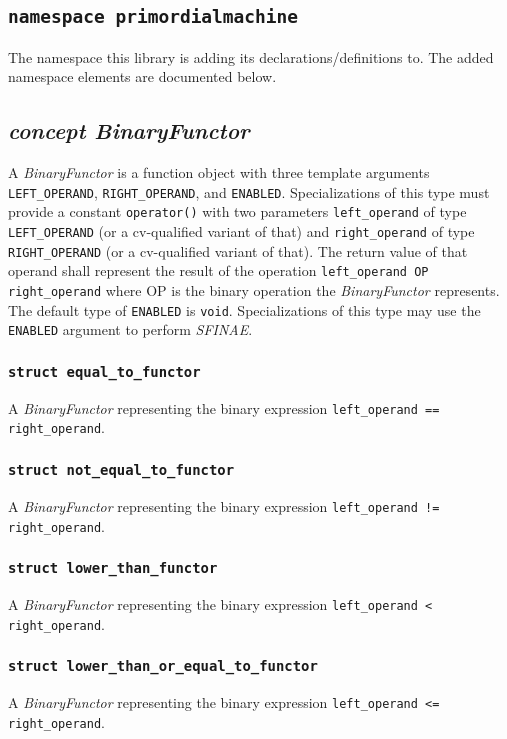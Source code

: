 \documentclass[oneside]{article}
\begin{document}
\subsection{\texttt{namespace primordialmachine}}
The namespace this library is adding its declarations/definitions to.
The added namespace elements are documented below.

\subsection{\textit{concept BinaryFunctor}}
A \textit{BinaryFunctor} is a function object with three template arguments \verb+LEFT_OPERAND+,
\verb+RIGHT_OPERAND+, and \verb+ENABLED+. Specializations of this type must provide a
constant \verb+operator()+ with two parameters \verb+left_operand+ of type \verb+LEFT_OPERAND+
(or a cv-qualified variant of that) and \verb+right_operand+ of type \verb+RIGHT_OPERAND+
(or a cv-qualified variant of that). The return value of that operand shall represent the
result of the operation \verb+left_operand OP right_operand+ where OP is the binary operation
the \textit{BinaryFunctor} represents.\\

\noindent{}The default type of \verb+ENABLED+ is \verb+void+. Specializations of this type may use
the \verb+ENABLED+ argument to perform \textit{SFINAE}.

\subsubsection{\texttt{struct equal\_to\_functor}}
A \textit{BinaryFunctor} representing the binary expression \verb|left_operand == right_operand|.

\subsubsection{\texttt{struct not\_equal\_to\_functor}}
A \textit{BinaryFunctor} representing the binary expression \verb|left_operand != right_operand|.

\subsubsection{\texttt{struct lower\_than\_functor}}
A \textit{BinaryFunctor} representing the binary expression \verb|left_operand < right_operand|.

\subsubsection{\texttt{struct lower\_than\_or\_equal\_to\_functor}}
A \textit{BinaryFunctor} representing the binary expression \verb|left_operand <= right_operand|.
\end{document}
